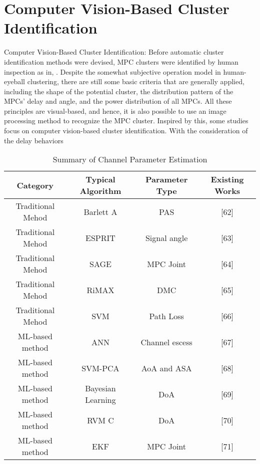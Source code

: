 \documentclass[conference]{IEEEtran}
\begin{document}
\section{Computer Vision-Based Cluster Identification}
Computer Vision-Based Cluster Identification: Before
automatic cluster identification methods were devised, MPC
clusters were identified by human inspection as in,
\cite{111}. Despite the somewhat subjective operation model
in human-eyeball clustering, there are still some basic criteria
that are generally applied, including the shape of the potential
cluster, the distribution pattern of the MPCs’ delay and angle,
and the power distribution of all MPCs. All these principles
are visual-based, and hence, it is also possible to use an image
processing method to recognize the MPC cluster. Inspired
by this, some studies focus on computer vision-based cluster
identification. With the consideration of the delay behaviors


\begin{table}[h]
\centering
\begin{tabular}{|c|c|c|c|} %
\hline
\textbf{Category} & \textbf{Typical Algorithm} & \textbf{Parameter Type} & \textbf{Existing Works} \\ %
\hline
	Traditional Mehod & Barlett A & PAS & [62] \\ %
	Traditional Mehod & ESPRIT & Signal angle & [63] \\ %
	Traditional Mehod & SAGE & MPC Joint & [64] \\ %
	Traditional Mehod& RiMAX & DMC & [65] \\ %
	Traditional Mehod& SVM & Path Loss & [66] \\ %
	ML-based method & ANN & Channel escess & [67] \\ %
	ML-based method & SVM-PCA & AoA and ASA & [68] \\ %
	 ML-based method&Bayesian Learning & DoA & [69] \\ %
	ML-based method & RVM C & DoA & [70] \\ %
	ML-based method & EKF & MPC Joint & [71] \\ %
\hline
\end{tabular}
\caption{Summary of Channel Parameter Estimation}
\label{tab:example}
\end{table}
\end{document}
